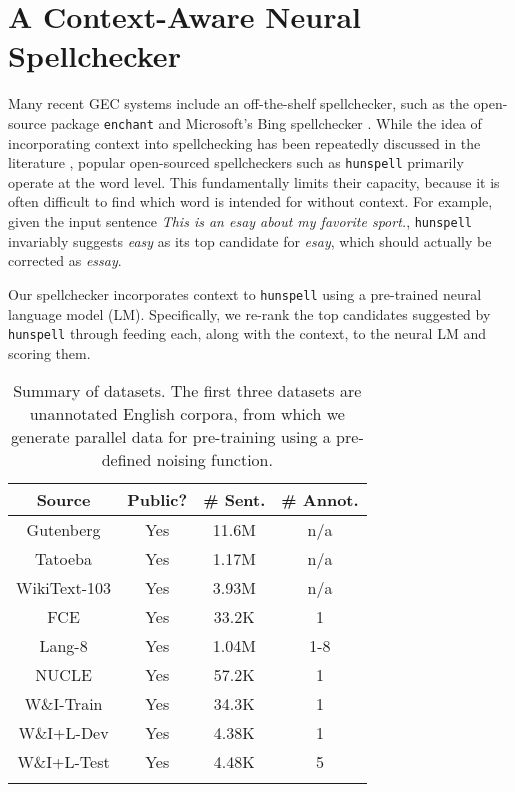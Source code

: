 \documentclass[11pt,a4paper]{article}
\begin{document}
\section{A Context-Aware Neural Spellchecker}\label{sec:spellchecker}

Many recent GEC systems include an off-the-shelf spellchecker, such as the open-source package \texttt{enchant} \cite{sakaguchi2017grammatical, junczys2018approaching} and Microsoft's Bing spellchecker \cite{ge2018fluency, ge2018reaching}. While the idea of incorporating context into spellchecking has been repeatedly discussed in the literature \cite{flor2012using, chollampatt2017connecting}, popular open-sourced spellcheckers such as \texttt{hunspell} primarily operate at the word level. 
This fundamentally limits their capacity, because it is often difficult to find which word is intended for without context.
For example, given the input sentence \textit{This is an esay about my favorite sport.}, \texttt{hunspell} invariably suggests \textit{easy} as its top candidate for \textit{esay}, which should actually be corrected as \textit{essay}.

Our spellchecker incorporates context to \texttt{hunspell} using a pre-trained neural language model (LM). 
Specifically, we re-rank the top candidates suggested by \texttt{hunspell} through feeding each, along with the context, to the neural LM and scoring them.

\begin{table}[t]
    \centering
    \begin{tabular}{cccc}
        \Xhline{1.1pt}
        \textbf{Source} & \textbf{Public?} & \textbf{\# Sent.} & \textbf{\# Annot.} \\ \hline
        Gutenberg & Yes & 11.6M & n/a \\ Tatoeba & Yes & 1.17M & n/a \\ WikiText-103 & Yes & 3.93M & n/a \\ \hline FCE & Yes & 33.2K & 1 \\ Lang-8 & Yes & 1.04M & 1-8 \\
        NUCLE & Yes & 57.2K & 1 \\ W\&I-Train & Yes & 34.3K & 1 \\ \hline W\&I+L-Dev & Yes & 4.38K & 1 \\ \hline
        W\&I+L-Test & Yes & 4.48K & 5 \\ \Xhline{1.1pt}
    \end{tabular}
    \caption{Summary of datasets. 
    The first three datasets are unannotated English corpora, from which we generate parallel data for pre-training using a pre-defined noising function.
    }
    \label{tbl:datasets}
\end{table}
\end{document}
